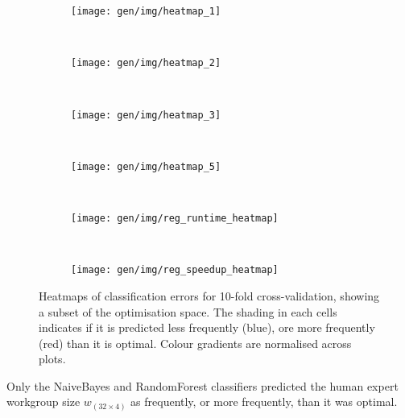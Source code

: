 \begin{figure}
\centering
\begin{subfigure}[t]{0.45\textwidth}
\centering
\texttt{[image: gen/img/heatmap\_1]}
\vspace{-1.5em} %
\caption{}
\label{fig:class-hmaps-1}
\end{subfigure}
~%
\begin{subfigure}[t]{0.45\textwidth}
\centering
\texttt{[image: gen/img/heatmap\_2]}
\vspace{-1.5em} %
\caption{}
\label{fig:class-hmaps-2}
\end{subfigure}
\\
\begin{subfigure}[t]{0.45\textwidth}
\centering
\texttt{[image: gen/img/heatmap\_3]}
\vspace{-1.5em} %
\caption{}
\label{fig:class-hmaps-3}
\end{subfigure}
~%
\begin{subfigure}[t]{0.45\textwidth}
\centering
\texttt{[image: gen/img/heatmap\_5]}
\vspace{-1.5em} %
\caption{}
\label{fig:class-hmaps-4}
\end{subfigure}
\\
\begin{subfigure}[t]{0.45\textwidth}
\centering
\texttt{[image: gen/img/reg\_runtime\_heatmap]}
\vspace{-1.5em} %
\caption{}
\label{fig:class-hmaps-5}
\end{subfigure}
~%
\begin{subfigure}[t]{0.45\textwidth}
\centering
\texttt{[image: gen/img/reg\_speedup\_heatmap]}
\vspace{-1.5em} %
\caption{}
\label{fig:class-hmaps-6}
\end{subfigure}
\caption[Prediction errors across classification techniques]{%
  Heatmaps of classification errors for 10-fold cross-validation,
  showing a subset of the optimisation space. The shading in each
  cells indicates if it is predicted less frequently (blue), ore more
  frequently (red) than it is optimal. Colour gradients are normalised
  across plots.%
}
\label{fig:class-hmaps}
\end{figure}


Only the NaiveBayes and RandomForest classifiers predicted the human
expert workgroup size $w_{(32 \times 4)}$ as frequently, or more
frequently, than it was optimal.

